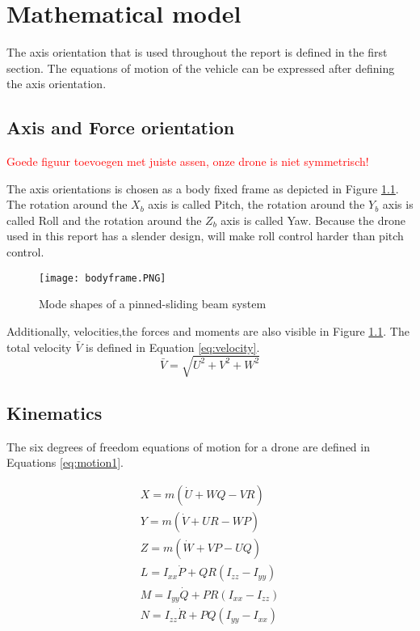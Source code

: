 \chapter{Mathematical model} \label{ch:3}

The axis orientation that is used throughout the report is defined in the first section. The equations of motion of the vehicle can be expressed after defining the axis orientation.

\section{Axis and Force orientation}

\textcolor{red}{Goede figuur toevoegen met juiste assen, onze drone is niet symmetrisch!}


The axis orientations is chosen as a body fixed frame as depicted in Figure \ref{fig:bodyframe}. The rotation around the $X_b$ axis is called Pitch, the rotation around the $Y_b$ axis is called Roll and the rotation around the $Z_b$ axis is called Yaw. Because the drone used in this report has a slender design, will make roll control harder than pitch control.

\begin{figure}[H]
\centering
\texttt{[image: bodyframe.PNG]}
\caption{Mode shapes of a pinned-sliding beam system}
\label{fig:bodyframe}
\end{figure}

Additionally, velocities,the forces and moments are also visible in Figure \ref{fig:bodyframe}. The total velocity $\bar{V}$ is defined in Equation \ref{eq:velocity}.
\begin{equation}
\bar{V}=\sqrt{U^2 +V^2+W^2}
\label{eq:velocity}
\end{equation}



\section{Kinematics}
The six degrees of freedom equations of motion for a drone are defined in Equations \ref{eq:motion1}.

\begin{equation} \label{eq:motion1}
\begin{aligned}
X=m\left(\dot{U}+WQ-VR\right)\\
Y=m\left(\dot{V}+UR-WP\right)\\
Z=m\left(\dot{W}+VP-UQ\right)\\
L=I_{xx} \dot{P}+QR \left(I_{zz} -I_{yy} \right)\\
M=I_{yy} \dot{Q}+PR \left(I_{xx} -I_{zz} \right)\\
N=I_{zz} \dot{R}+PQ \left(I_{yy} -I_{xx} \right)\\
\end{aligned}
\end{equation}

